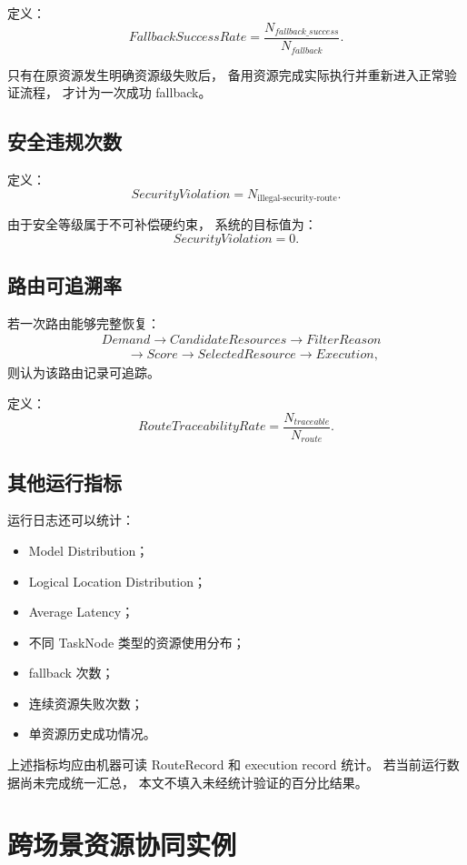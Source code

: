 \documentclass[UTF8,a4paper,12pt,oneside]{ctexbook}
\begin{document}
定义：
\[
FallbackSuccessRate
=
\frac{N_{fallback\_success}}
{N_{fallback}}.
\]

只有在原资源发生明确资源级失败后，
备用资源完成实际执行并重新进入正常验证流程，
才计为一次成功 fallback。


\subsection{安全违规次数}

定义：
\[
SecurityViolation
=
N_{\text{illegal-security-route}}.
\]

由于安全等级属于不可补偿硬约束，
系统的目标值为：
\[
SecurityViolation=0.
\]


\subsection{路由可追溯率}

若一次路由能够完整恢复：
\[
\begin{aligned}
&Demand \rightarrow CandidateResources \rightarrow FilterReason \\[3pt]
&\qquad\rightarrow Score \rightarrow SelectedResource
\rightarrow Execution,
\end{aligned}
\]
则认为该路由记录可追踪。

定义：
\[
RouteTraceabilityRate
=
\frac{N_{traceable}}
{N_{route}}.
\]


\subsection{其他运行指标}

运行日志还可以统计：

\begin{itemize}
    \item Model Distribution；
    \item Logical Location Distribution；
    \item Average Latency；
    \item 不同 TaskNode 类型的资源使用分布；
    \item fallback 次数；
    \item 连续资源失败次数；
    \item 单资源历史成功情况。
\end{itemize}

上述指标均应由机器可读 RouteRecord 和 execution record 统计。
若当前运行数据尚未完成统一汇总，
本文不填入未经统计验证的百分比结果。


\section{跨场景资源协同实例}
\end{document}
